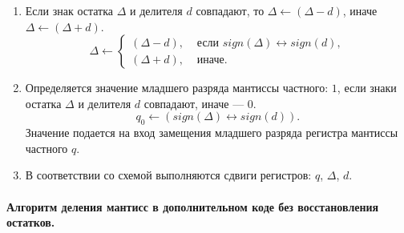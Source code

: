 \begin{enumerate}
    \item Если знак остатка $\Delta$ и делителя $d$ совпадают, то $\Delta\gets(\Delta-d)$, иначе $\Delta\gets(\Delta+d)$.
    \[
        \Delta\gets
            \begin{cases}
                (\Delta-d), & \text{ если $sign(\Delta)\leftrightarrow sign(d)$},\\
                (\Delta+d), & \text{ иначе}.
            \end{cases}
    \]
    
    \item Определяется значение младшего разряда мантиссы частного: $1$, если знаки остатка $\Delta$ и делителя $d$ совпадают, иначе --- $0$.
    \[
        q_0\gets(sign(\Delta) \leftrightarrow sign(d)).
    \]
    Значение подается на вход замещения младшего разряда регистра мантиссы частного $q$.
    
    \item В соответствии со схемой выполняются сдвиги регистров: $q$, $\Delta$, $d$.
\end{enumerate}


\paragraph{Алгоритм деления мантисс в дополнительном коде без восстановления остатков.}

